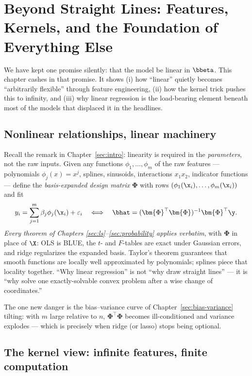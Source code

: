 \section[Beyond Straight Lines: Features, Kernels, and Foundations]{Beyond Straight Lines: Features, Kernels, and the Foundation of Everything Else}\label{sec:beyond}

We have kept one promise silently: that the model be linear in $\bbeta$. This chapter cashes in that promise. It shows (i) how ``linear'' quietly becomes ``arbitrarily flexible'' through feature engineering, (ii) how the kernel trick pushes this to infinity, and (iii) why linear regression is the load-bearing element beneath most of the models that displaced it in the headlines.

\subsection{Nonlinear relationships, linear machinery}

Recall the remark in Chapter~\ref{sec:intro}: linearity is required in the \emph{parameters}, not the raw inputs. Given any functions $\phi_1, \dots, \phi_m$ of the raw features — polynomials $\phi_j(x) = x^j$, splines, sinusoids, interactions $x_1 x_2$, indicator functions — define the \emph{basis-expanded design matrix} $\bm{\Phi}$ with rows $(\phi_1(\x_i), \dots, \phi_m(\x_i))$ and fit
\[
  y_i = \sum_{j=1}^m \beta_j \phi_j(\x_i) + \varepsilon_i
  \quad\Longleftrightarrow\quad
  \bhat = (\bm{\Phi}^\top \bm{\Phi})^{-1} \bm{\Phi}^\top \y .
\]
\emph{Every theorem of Chapters \ref{sec:ls}--\ref{sec:probability} applies verbatim}, with $\bm{\Phi}$ in place of $\X$: OLS is BLUE, the $t$- and $F$-tables are exact under Gaussian errors, and ridge regularizes the expanded basis. Taylor's theorem guarantees that smooth functions are locally well approximated by polynomials; splines piece that locality together. ``Why linear regression'' is not ``why draw straight lines'' — it is ``why solve one exactly-solvable convex problem after a wise change of coordinates.''

The one new danger is the bias--variance curve of Chapter~\ref{sec:bias-variance} tilting: with $m$ large relative to $n$, $\bm{\Phi}^\top\bm{\Phi}$ becomes ill-conditioned and variance explodes — which is precisely when ridge (or lasso) stops being optional.

\subsection{The kernel view: infinite features, finite computation}

